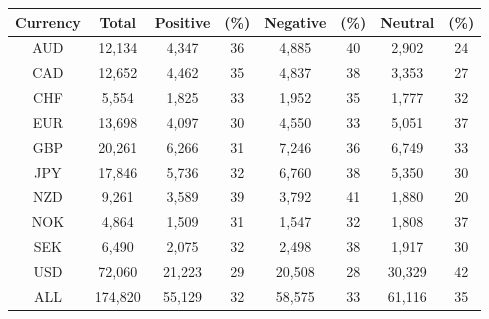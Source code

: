 \documentclass[12pt,oneside,letter]{article}
\begin{document}
\begin{landscape}
\begin{table}[ht]
{\begin{tabular}{*{8}{c}}
	\toprule
	\multicolumn{1}{c}{\textbf{Currency}} & 
	\multicolumn{1}{c}{\textbf{Total}} & 
	\multicolumn{1}{c}{\textbf{Positive}} & 
	\multicolumn{1}{c}{\textbf{(\%)}} & 
	\multicolumn{1}{c}{\textbf{Negative}} & 
	\multicolumn{1}{c}{\textbf{(\%)}} & 
	\multicolumn{1}{c}{\textbf{Neutral}} & 
	\multicolumn{1}{c}{\textbf{(\%)}} \\ 
	\midrule
	AUD & 12,134 & 4,347 & 36 & 4,885 & 40 & 2,902 & 24 \\ 
	CAD & 12,652 & 4,462 & 35 & 4,837 & 38 & 3,353 & 27 \\ 
	CHF & 5,554  & 1,825 & 33 & 1,952 & 35 & 1,777 & 32 \\ 
	EUR & 13,698 & 4,097 & 30 & 4,550 & 33 & 5,051 & 37 \\ 
	GBP & 20,261 & 6,266 & 31 & 7,246 & 36 & 6,749 & 33 \\ 
	JPY & 17,846 & 5,736 & 32 & 6,760 & 38 & 5,350 & 30 \\ 
	NZD & 9,261  & 3,589 & 39 & 3,792 & 41 & 1,880 & 20 \\ 
	NOK & 4,864  & 1,509 & 31 & 1,547 & 32 & 1,808 & 37 \\ 
	SEK & 6,490  & 2,075 & 32 & 2,498 & 38 & 1,917 & 30 \\ 
	USD & 72,060 & 21,223 & 29 & 20,508 & 28 & 30,329 & 42 \\ 
	ALL & 174,820 & 55,129 & 32 & 58,575 & 33 & 61,116 & 35 \\ 
	\bottomrule	    
\end{tabular}
	}
		
	\end{table}
\end{landscape}
\end{document}
